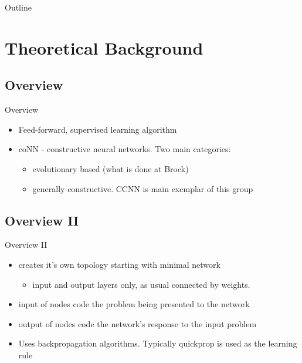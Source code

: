 \documentclass[presentation]{beamer}
\author{Will Rempel}
\date{\today}
\title{}
\begin{document}
\begin{frame}{Outline}
\tableofcontents
\end{frame}

\section{Theoretical Background}
\label{sec:orgeb84d66}
\subsection{Overview}
\begin{frame}{Overview}
\label{sec:org9345558}
\begin{itemize}
\item Feed-forward, supervised learning algorithm
\item coNN - constructive neural networks. Two main categories:
\begin{itemize}
\item evolutionary based (what is done at Brock)
\item generally constructive. CCNN is main exemplar of this group
\end{itemize}
\end{itemize}
\end{frame}

\subsection{Overview II}
\label{sec:orgb89dcee}
\begin{frame}{Overview II}
\begin{itemize}
\item creates it's own topology starting with minimal network
\begin{itemize}
\item input and output layers only, as usual connected by weights.
\end{itemize}
\item input of nodes code the problem being presented to the network
\item output of nodes code the network's response to the input problem
\item Uses backpropagation algorithms. Typically quickprop is used as the learning rule
\end{itemize}
\end{frame}
\end{document}
